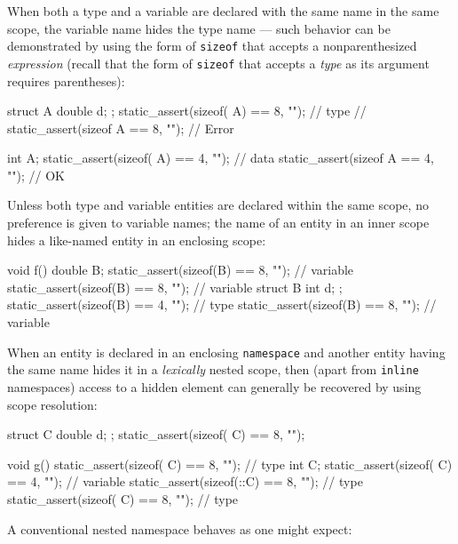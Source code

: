 When both a type and a variable are declared with the same name in the
same scope, the variable name hides the type name --- such behavior can
be demonstrated by using the form of \lstinline!sizeof! that accepts a
nonparenthesized \emph{expression} (recall that the form of \lstinline!sizeof! that accepts a \emph{type} as its argument requires parentheses):

\begin{emcppslisting}
struct A { double d; };  static_assert(sizeof(  A) == 8, "");  // type
                      // static_assert(sizeof   A  == 8, "");  // Error

int A;                   static_assert(sizeof(  A) == 4, "");  // data
                         static_assert(sizeof   A  == 4, "");  // OK
\end{emcppslisting}

\noindent Unless both type and variable entities are declared within the same
scope, no preference is given to variable names; the name of an entity
in an inner scope hides a like-named entity in an enclosing scope:

\begin{emcppslisting}
void f()
{
    double B;                 static_assert(sizeof(B) == 8, "");  // variable
    {                         static_assert(sizeof(B) == 8, "");  // variable
        struct B { int d; };  static_assert(sizeof(B) == 4, "");  // type
    }                         static_assert(sizeof(B) == 8, "");  // variable
}
\end{emcppslisting}

\noindent When an entity is declared in an enclosing \lstinline!namespace! and
another entity having the same name hides it in a \emph{lexically}
nested scope, then (apart from \lstinline!inline! namespaces) access to a
hidden element can generally be recovered by using scope resolution:

\begin{emcppslisting}
struct C { double d; };  static_assert(sizeof(  C) == 8, "");

void g()
{                        static_assert(sizeof(  C) == 8, "");  // type
    int C;               static_assert(sizeof(  C) == 4, "");  // variable
                         static_assert(sizeof(::C) == 8, "");  // type
}                        static_assert(sizeof(  C) == 8, "");  // type
\end{emcppslisting}

\noindent A conventional nested namespace behaves as one might expect:

